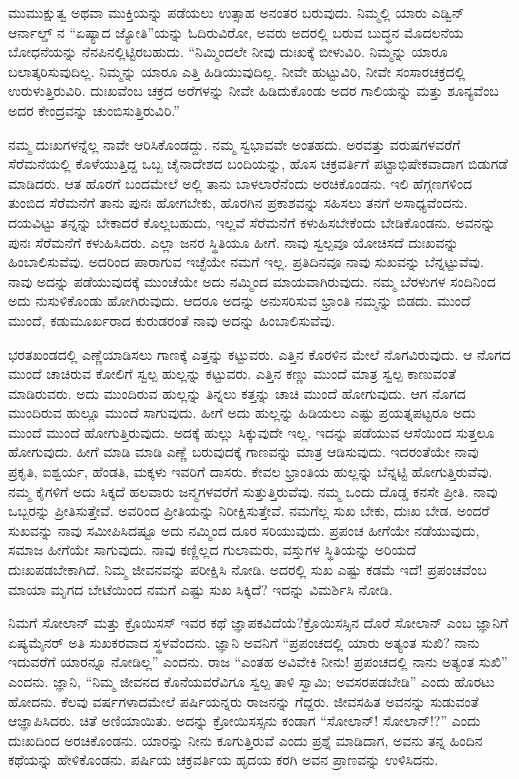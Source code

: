 ಮುಮುಕ್ಷುತ್ವ ಅಥವಾ ಮುಕ್ತಿಯನ್ನು ಪಡೆಯಲು ಉತ್ಸಾಹ ಅನಂತರ ಬರುವುದು. ನಿಮ್ಮಲ್ಲಿ ಯಾರು ಎಡ್ವಿನ್ ಆರ್ನಾಲ್ಡ್ ನ “ಏಷ್ಯಾದ ಜ್ಯೋತಿ”ಯನ್ನು ಓದಿರುವಿರೋ, ಅವರು ಅದರಲ್ಲಿ ಬರುವ ಬುದ್ಧನ ಮೊದಲನೆಯ ಬೋಧನೆಯನ್ನು ನೆನಪಿನಲ್ಲಿಟ್ಟಿರಬಹುದು. “ನಿಮ್ಮಿಂದಲೇ ನೀವು ದುಃಖಕ್ಕೆ ಬೀಳುವಿರಿ. ನಿಮ್ಮನ್ನು ಯಾರೂ ಬಲಾತ್ಕರಿಸುವುದಿಲ್ಲ. ನಿಮ್ಮನ್ನು ಯಾರೂ ಎತ್ತಿ ಹಿಡಿಯುವುದಿಲ್ಲ. ನೀವೇ ಹುಟ್ಟುವಿರಿ, ನೀವೇ ಸಂಸಾರಚಕ್ರದಲ್ಲಿ ಉರುಳುತ್ತಿರುವಿರಿ. ದುಃಖವೆಂಬ ಚಕ್ರದ ಅರೆಗಳನ್ನು ನೀವೇ ಹಿಡಿದುಕೊಂಡು ಅದರ ಗಾಲಿಯನ್ನು ಮತ್ತು ಶೂನ್ಯವೆಂಬ ಅದರ ಕೇಂದ್ರವನ್ನು ಚುಂಬಿಸುತ್ತಿರುವಿರಿ.”

ನಮ್ಮ ದುಃಖಗಳನ್ನೆಲ್ಲ ನಾವೇ ಆರಿಸಿಕೊಂಡದ್ದು. ನಮ್ಮ ಸ್ವಭಾವವೇ ಅಂತಹದು. ಅರವತ್ತು ವರುಷಗಳವರೆಗೆ ಸೆರೆಮನೆಯಲ್ಲಿ ಕೊಳೆಯುತ್ತಿದ್ದ ಒಬ್ಬ ಚೈನಾದೇಶದ ಬಂದಿಯನ್ನು, ಹೊಸ ಚಕ್ರವರ್ತಿಗೆ ಪಟ್ಟಾಭಿಷೇಕವಾದಾಗ ಬಿಡುಗಡೆ ಮಾಡಿದರು. ಆತ ಹೊರಗೆ ಬಂದಮೇಲೆ ಅಲ್ಲಿ ತಾನು ಬಾಳಲಾರೆನೆಂದು ಅರಚಿಕೊಂಡನು. ಇಲಿ ಹೆಗ್ಗಣಗಳಿಂದ ತುಂಬಿದ ಸೆರೆಮನೆಗೆ ತಾನು ಪುನಃ ಹೋಗಬೇಕು, ಹೊರಗಿನ ಪ್ರಕಾಶವನ್ನು ಸಹಿಸಲು ತನಗೆ ಅಸಾಧ್ಯವೆಂದನು. ದಯವಿಟ್ಟು ತನ್ನನ್ನು ಬೇಕಾದರೆ ಕೊಲ್ಲಬಹುದು, ಇಲ್ಲವೆ ಸೆರೆಮನೆಗೆ ಕಳುಹಿಸಬೇಕೆಂದು ಬೇಡಿಕೊಂಡನು. ಅವನನ್ನು ಪುನಃ ಸೆರೆಮನೆಗೆ ಕಳುಹಿಸಿದರು. ಎಲ್ಲಾ ಜನರ ಸ್ಥಿತಿಯೂ ಹೀಗೆ. ನಾವು ಸ್ವಲ್ಪವೂ ಯೋಚಿಸದೆ ದುಃಖವನ್ನು ಹಿಂಬಾಲಿಸುವೆವು. ಅದರಿಂದ ಪಾರಾಗುವ ಇಚ್ಛೆಯೇ ನಮಗೆ ಇಲ್ಲ. ಪ್ರತಿದಿನವೂ ನಾವು ಸುಖವನ್ನು ಬೆನ್ನಟ್ಟುವೆವು. ನಾವು ಅದನ್ನು ಪಡೆಯುವುದಕ್ಕೆ ಮುಂಚೆಯೇ ಅದು ನಮ್ಮಿಂದ ಮಾಯವಾಗಿರುವುದು. ನಮ್ಮ ಬೆರಳುಗಳ ಸಂದಿನಿಂದ ಅದು ನುಸುಳಿಕೊಂಡು ಹೋಗಿರುವುದು. ಆದರೂ ಅದನ್ನು ಅನುಸರಿಸುವ ಭ್ರಾಂತಿ ನಮ್ಮನ್ನು ಬಿಡದು. ಮುಂದೆ ಮುಂದೆ, ಕಡುಮೂರ್ಖರಾದ ಕುರುಡರಂತೆ ನಾವು ಅದನ್ನು ಹಿಂಬಾಲಿಸುವೆವು.

ಭರತಖಂಡದಲ್ಲಿ ಎಣ್ಣೆಯಾಡಿಸಲು ಗಾಣಕ್ಕೆ ಎತ್ತನ್ನು ಕಟ್ಟುವರು. ಎತ್ತಿನ ಕೊರಳಿನ ಮೇಲೆ ನೊಗವಿರುವುದು. ಆ ನೊಗದ ಮುಂದೆ ಚಾಚಿರುವ ಕೋಲಿಗೆ ಸ್ವಲ್ಪ ಹುಲ್ಲನ್ನು ಕಟ್ಟುವರು. ಎತ್ತಿನ ಕಣ್ಣು ಮುಂದೆ ಮಾತ್ರ ಸ್ವಲ್ಪ ಕಾಣುವಂತೆ ಮಾಡಿರುವರು. ಅದು ಮುಂದಿರುವ ಹುಲ್ಲನ್ನು ತಿನ್ನಲು ಕತ್ತನ್ನು ಚಾಚಿ ಮುಂದೆ ಹೋಗುವುದು. ಆಗ ನೊಗದ ಮುಂದಿರುವ ಹುಲ್ಲೂ ಮುಂದೆ ಸಾಗುವುದು. ಹೀಗೆ ಅದು ಹುಲ್ಲನ್ನು ಹಿಡಿಯಲು ಎಷ್ಟು ಪ್ರಯತ್ನಪಟ್ಟರೂ ಅದು ಮುಂದೆ ಮುಂದೆ ಹೋಗುತ್ತಿರುವುದು. ಅದಕ್ಕೆ ಹುಲ್ಲು ಸಿಕ್ಕುವುದೇ ಇಲ್ಲ. ಇದನ್ನು ಪಡೆಯುವ ಆಸೆಯಿಂದ ಸುತ್ತಲೂ ಹೋಗುವುದು. ಹೀಗೆ ಮಾಡಿ ಮಾಡಿ ಎಣ್ಣೆ ಬರುವುದಕ್ಕೆ ಗಾಣವನ್ನು ಮಾತ್ರ ಆಡಿಸುವುದು. ಇದರಂತೆಯೇ ನಾವು ಪ್ರಕೃತಿ, ಐಶ್ವರ್ಯ, ಹೆಂಡತಿ, ಮಕ್ಕಳು ಇವರಿಗೆ ದಾಸರು. ಕೇವಲ ಭ್ರಾಂತಿಯ ಹುಲ್ಲನ್ನು ಬೆನ್ನಟ್ಟಿ ಹೋಗುತ್ತಿರುವೆವು. ನಮ್ಮ ಕೈಗಳಿಗೆ ಅದು ಸಿಕ್ಕದೆ ಹಲವಾರು ಜನ್ಮಗಳವರೆಗೆ ಸುತ್ತುತ್ತಿರುವೆವು. ನಮ್ಮ ಒಂದು ದೊಡ್ಡ ಕನಸೇ ಪ್ರೀತಿ. ನಾವು ಒಬ್ಬರನ್ನು ಪ್ರೀತಿಸುತ್ತೇವೆ. ಅವರಿಂದ ಪ್ರೀತಿಯನ್ನು ನಿರೀಕ್ಷಿಸುತ್ತೇವೆ. ನಮಗೆಲ್ಲ ಸುಖ ಬೇಕು, ದುಃಖ ಬೇಡ. ಅಂದರೆ ಸುಖವನ್ನು ನಾವು ಸಮೀಪಿಸಿದಷ್ಟೂ ಅದು ನಮ್ಮಿಂದ ದೂರ ಸರಿಯುವುದು. ಪ್ರಪಂಚ ಹೀಗೆಯೇ ನಡೆಯುವುದು, ಸಮಾಜ ಹೀಗೆಯೇ ಸಾಗುವುದು. ನಾವು ಕಣ್ಣಿಲ್ಲದ ಗುಲಾಮರು, ವಸ್ತುಗಳ ಸ್ಥಿತಿಯನ್ನು ಅರಿಯದೆ ದುಃಖಪಡಬೇಕಾಗಿದೆ. ನಿಮ್ಮ ಜೀವನವನ್ನು ಪರೀಕ್ಷಿಸಿ ನೋಡಿ. ಅದರಲ್ಲಿ ಸುಖ ಎಷ್ಟು ಕಡಮೆ ಇದೆ! ಪ್ರಪಂಚವೆಂಬ ಮಾಯಾ ಮೃಗದ ಬೇಟೆಯಿಂದ ನಮಗೆ ಎಷ್ಟು ಸುಖ ಸಿಕ್ಕಿದೆ? ಇದನ್ನು ವಿಮರ್ಶಿಸಿ ನೋಡಿ.

ನಿಮಗೆ ಸೋಲಾನ್ ಮತ್ತು ಕ್ರೊಯಿಸಸ್ ಇವರ ಕಥೆ ಜ್ಞಾಪಕವಿದೆಯೆ?\break ಕ್ರೊಯಿಸಸ್ಸಿನ ದೊರೆ ಸೋಲಾನ್ ಎಂಬ ಜ್ಞಾನಿಗೆ ಏಷ್ಯಮೈನರ್ ಅತಿ ಸುಖಕರವಾದ ಸ್ಥಳವೆಂದನು. ಜ್ಞಾನಿ ಅವನಿಗೆ “ಪ್ರಪಂಚದಲ್ಲಿ ಯಾರು ಅತ್ಯಂತ ಸುಖಿ? ನಾನು ಇದುವರೆಗೆ ಯಾರನ್ನೂ ನೋಡಿಲ್ಲ” ಎಂದನು. ರಾಜ “ಎಂತಹ ಅವಿವೇಕಿ ನೀನು! ಪ್ರಪಂಚದಲ್ಲಿ ನಾನು ಅತ್ಯಂತ ಸುಖಿ'' ಎಂದನು. ಜ್ಞಾನಿ, “ನಿಮ್ಮ ಜೀವನದ ಕೊನೆಯವರೆವಿಗೂ ಸ್ವಲ್ಪ ತಾಳಿ ಸ್ವಾಮಿ; ಅವಸರಪಡಬೇಡಿ” ಎಂದು ಹೊರಟು ಹೋದನು. ಕೆಲವು ವರ್ಷಗಳಾದಮೇಲೆ ಪರ್ಷಿಯನ್ನರು ರಾಜನನ್ನು ಗೆದ್ದರು. ಜೀವಸಹಿತ ಅವನನ್ನು ಸುಡುವಂತೆ ಆಜ್ಞಾಪಿಸಿದರು. ಚಿತೆ ಅಣಿಯಾಯಿತು. ಅದನ್ನು ಕ್ರೋಯಿಸಸ್ಸನು ಕಂಡಾಗ “ಸೋಲಾನ್! ಸೋಲಾನ್!?” ಎಂದು ದುಃಖದಿಂದ ಅರಚಿಕೊಂಡನು. ಯಾರನ್ನು ನೀನು ಕೂಗುತ್ತಿರುವೆ ಎಂದು ಪ್ರಶ್ನೆ ಮಾಡಿದಾಗ, ಅವನು ತನ್ನ ಹಿಂದಿನ ಕಥೆಯನ್ನು ಹೇಳಿಕೊಂಡನು. ಪರ್ಷಿಯ ಚಕ್ರವರ್ತಿಯ ಹೃದಯ ಕರಗಿ ಅವನ ಪ್ರಾಣವನ್ನು ಉಳಿಸಿದನು.


